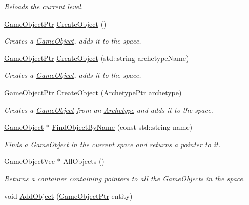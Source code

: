 \begin{DoxyCompactItemize}
\begin{DoxyCompactList}\small\item\em Reloads the current level. \end{DoxyCompactList}\item 
\hyperlink{classDCEngine_1_1GameObject}{Game\-Object\-Ptr} \hyperlink{classDCEngine_1_1Space_ad3873ec6def36b0ae9de18883233136d}{Create\-Object} ()
\begin{DoxyCompactList}\small\item\em Creates a \hyperlink{classDCEngine_1_1GameObject}{Game\-Object}, adds it to the space. \end{DoxyCompactList}\item 
\hyperlink{classDCEngine_1_1GameObject}{Game\-Object\-Ptr} \hyperlink{classDCEngine_1_1Space_a1f9cb13d706bb1edf849898be9a6cd8e}{Create\-Object} (std\-::string archetype\-Name)
\begin{DoxyCompactList}\small\item\em Creates a \hyperlink{classDCEngine_1_1GameObject}{Game\-Object}, adds it to the space. \end{DoxyCompactList}\item 
\hyperlink{classDCEngine_1_1GameObject}{Game\-Object\-Ptr} \hyperlink{classDCEngine_1_1Space_a3fea748f5ee97ee31c0f9840543990cc}{Create\-Object} (Archetype\-Ptr archetype)
\begin{DoxyCompactList}\small\item\em Creates a \hyperlink{classDCEngine_1_1GameObject}{Game\-Object} from an \hyperlink{classDCEngine_1_1Archetype}{Archetype} and adds it to the space. \end{DoxyCompactList}\item 
\hyperlink{classDCEngine_1_1GameObject}{Game\-Object} $\ast$ \hyperlink{classDCEngine_1_1Space_acc12518e2782e5982ca1ac0d7f46ed21}{Find\-Object\-By\-Name} (const std\-::string name)
\begin{DoxyCompactList}\small\item\em Finds a \hyperlink{classDCEngine_1_1GameObject}{Game\-Object} in the current space and returns a pointer to it. \end{DoxyCompactList}\item 
Game\-Object\-Vec $\ast$ \hyperlink{classDCEngine_1_1Space_aa25dd95fa502f0bd350c5f49adb90a67}{All\-Objects} ()
\begin{DoxyCompactList}\small\item\em Returns a container containing pointers to all the Game\-Objects in the space. \end{DoxyCompactList}\item 
\hypertarget{classDCEngine_1_1Space_a540d3d9c70823c10199664df89d87d1c}{void \hyperlink{classDCEngine_1_1Space_a540d3d9c70823c10199664df89d87d1c}{Add\-Object} (\hyperlink{classDCEngine_1_1GameObject}{Game\-Object\-Ptr} entity)}\label{classDCEngine_1_1Space_a540d3d9c70823c10199664df89d87d1c}


\end{DoxyCompactItemize}
